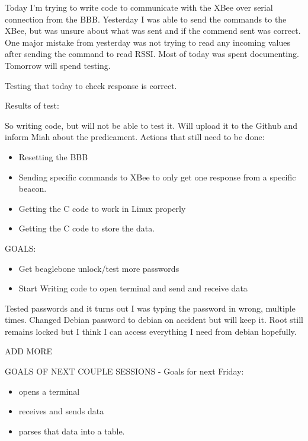 \documentclass[fontsize=11pt, %
                             paper=letter, %
                             twoside, %
                             captions=tableheading,
                             index=totoc,
                             hyperref]{labbook}
\begin{document}
\begin{addmargin}[0cm]{0cm}
Today I'm trying to write code to communicate with the XBee over serial connection from the BBB. Yesterday I was able to send the commands to the XBee, but was unsure about what was sent and if the commend sent was correct. One major mistake from yesterday was not trying to read any incoming values after sending the command to read RSSI. Most of today was spent documenting. Tomorrow will spend testing.


Testing that today to check response is correct. 

Results of test: 

So writing code, but will not be able to test it. Will upload it to the Github and inform Miah about the predicament. Actions that still need to be done:

\begin{itemize}
\item Resetting the BBB
\item Sending specific commands to XBee to only get one response from a specific beacon. 
\item Getting the C code to work in Linux properly
\item Getting the C code to store the data. 
\end{itemize}

GOALS:
\begin{itemize}
\item Get beaglebone unlock/test more passwords
\item Start Writing code to open terminal and send and receive data
\end{itemize}

Tested passwords and it turns out I was typing the password in wrong, multiple times. Changed Debian password to debian on accident but will keep it. Root still remains locked but I think I can access everything I need from debian hopefully.

ADD MORE

GOALS OF NEXT COUPLE SESSIONS - Goals for next Friday:
\begin{itemize}
\item opens a terminal
\item receives and sends data
\item parses that data into a table. 

\end{itemize}

\end{addmargin}
\end{document}
